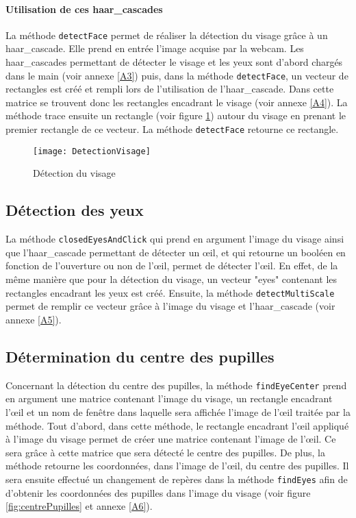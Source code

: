 \paragraph{Utilisation de ces haar\_cascades}

La méthode \lstinline=detectFace= permet de réaliser la détection du visage grâce à un haar\_cascade. Elle prend en entrée l’image acquise par la webcam. Les haar\_cascades permettant de détecter le visage et les yeux sont d’abord chargés dans le main (voir annexe \ref{A3}) puis, dans la méthode \lstinline=detectFace=, un vecteur de rectangles est créé et rempli lors de l’utilisation de l’haar\_cascade. Dans cette matrice se trouvent donc les rectangles encadrant le visage (voir annexe \ref{A4}). La méthode trace ensuite un rectangle (voir figure \ref{fig:DetectionVisage}) autour du visage en prenant le premier rectangle de ce vecteur. La méthode \lstinline=detectFace= retourne ce rectangle.

\begin{figure}[H]
  \centering
  \texttt{[image: DetectionVisage]}
  \caption{Détection du visage}
  \label{fig:DetectionVisage}
\end{figure}

\subsection{Détection des yeux}

La méthode \lstinline=closedEyesAndClick= qui prend en argument l’image du visage ainsi que l’haar\_cascade permettant de détecter un œil, et qui retourne un booléen en fonction de l’ouverture ou non de l’œil, permet de détecter l’œil. En effet, de la même manière que pour la détection du visage, un vecteur "eyes" contenant les rectangles encadrant les yeux est créé. Ensuite, la méthode \lstinline=detectMultiScale= permet de remplir ce vecteur grâce à l’image du visage et l’haar\_cascade (voir annexe \ref{A5}).

\subsection{Détermination du centre des pupilles}

Concernant la détection du centre des pupilles, la méthode \lstinline=findEyeCenter= prend en argument une matrice contenant l’image du visage, un rectangle encadrant l’œil et un nom de fenêtre dans laquelle sera affichée l’image de l’œil traitée par la méthode. Tout d’abord, dans cette méthode, le rectangle encadrant l’œil appliqué à l’image du visage permet de créer une matrice contenant l’image de l’œil. Ce sera grâce à cette matrice que sera détecté le centre des pupilles. De plus, la méthode retourne les coordonnées, dans l’image de l’œil, du centre des pupilles. Il sera ensuite effectué un changement de repères dans la méthode \lstinline=findEyes= afin de d’obtenir les coordonnées des pupilles dans l’image du visage (voir figure \ref{fig:centrePupilles} et annexe \ref{A6}).


